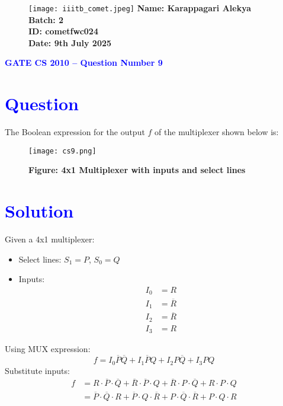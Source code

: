 \documentclass[twocolumn]{article}
\begin{document}
\begin{figure}[t]
    \texttt{[image: iiitb\_comet.jpeg]} %
    \textbf{Name: Karappagari Alekya} \\
    \textbf{Batch: 2} \\
    \textbf{ID: cometfwc024} \\
    \textbf{Date: 9th July 2025}
\end{figure}

\begin{center}
    {\LARGE \textbf{\textcolor{blue}{GATE CS 2010 – Question Number 9}}}
\end{center}

\section*{\textcolor{blue}{Question}}
The Boolean expression for the output $f$ of the multiplexer shown below is:

\begin{figure}[h]
    \centering
    \texttt{[image: cs9.png]}
    \caption*{\textbf{Figure: 4x1 Multiplexer with inputs and select lines}}
\end{figure}

\section*{\textcolor{blue}{Solution}}
Given a 4x1 multiplexer:
\begin{itemize}
    \item Select lines: $S_1 = P$, $S_0 = Q$
    \item Inputs:
    \begin{align*}
        I_0 &= R \\
        I_1 &= \overline{R} \\
        I_2 &= \overline{R} \\
        I_3 &= R
    \end{align*}
\end{itemize}

Using MUX expression:
\[ f = I_0 \overline{P} \overline{Q} + I_1 \overline{P} Q + I_2 P \overline{Q} + I_3 P Q \]
Substitute inputs:
\begin{align*}
    f &= R \cdot \overline{P} \cdot \overline{Q} + \overline{R} \cdot \overline{P} \cdot Q + \overline{R} \cdot P \cdot \overline{Q} + R \cdot P \cdot Q \\
      &= \overline{P} \cdot \overline{Q} \cdot R + \overline{P} \cdot Q \cdot \overline{R} + P \cdot \overline{Q} \cdot \overline{R} + P \cdot Q \cdot R
\end{align*}
\end{document}

